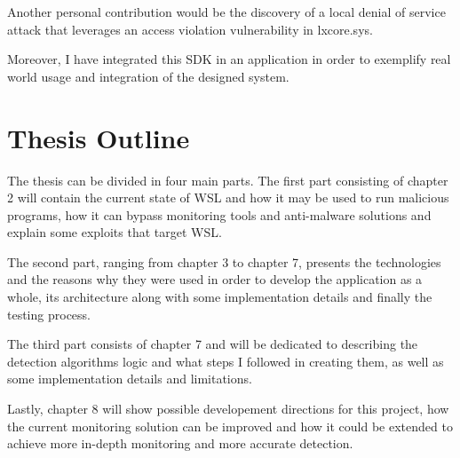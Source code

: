         Another personal contribution would be the discovery of a local denial of service attack that leverages an access violation vulnerability
        in lxcore.sys.

        Moreover, I have integrated this SDK in an application in order to exemplify real world usage and integration of the designed
        system. 
        
    \section{Thesis Outline}
        The thesis can be divided in four main parts. The first part consisting of chapter 2 will contain the current state of WSL and how it may
        be used to run malicious programs, how it can bypass monitoring tools and anti-malware solutions and explain some exploits
        that target WSL.

        The second part, ranging from chapter 3 to chapter 7, presents the technologies and the reasons why they were used in order to
        develop the application as a whole, its architecture along with some implementation details and finally the testing process.

        The third part consists of chapter 7 and will be dedicated to describing the detection algorithms logic and what steps I followed in
        creating them, as well as some implementation details and limitations.

        Lastly, chapter 8 will show possible developement directions for this project, how the current monitoring solution can be improved and
        how it could be extended to achieve more in-depth monitoring and more accurate detection.
        